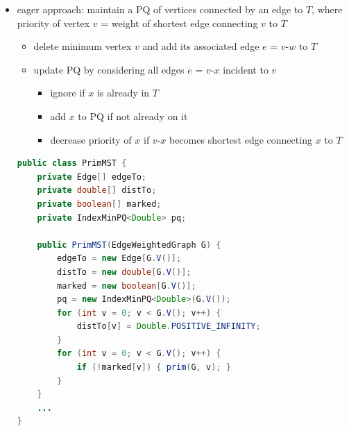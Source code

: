 \documentclass[8pt,a4paper,compress]{beamer}
\begin{document}
\begin{frame}[fragile]
\begin{itemize}
\item eager approach: maintain a PQ of vertices connected by an edge to $T$, where priority of vertex $v$ = weight of shortest edge connecting $v$ to $T$
\begin{itemize}
\item delete minimum vertex $v$ and add its associated edge $e$ = $v$-$w$ to $T$ 

\item update PQ by considering all edges $e$ = $v$-$x$ incident to $v$

\begin{itemize}
\item ignore if $x$ is already in $T$

\item add $x$ to PQ if not already on it

\item decrease priority of $x$ if $v$-$x$ becomes shortest edge connecting $x$ to $T$
\end{itemize}
\end{itemize}

\begin{lstlisting}[language=Java]
public class PrimMST {
    private Edge[] edgeTo; 
    private double[] distTo; 
    private boolean[] marked; 
    private IndexMinPQ<Double> pq;

    public PrimMST(EdgeWeightedGraph G) {
        edgeTo = new Edge[G.V()];
        distTo = new double[G.V()];
        marked = new boolean[G.V()];
        pq = new IndexMinPQ<Double>(G.V());
        for (int v = 0; v < G.V(); v++) { 
            distTo[v] = Double.POSITIVE_INFINITY;
        }
        for (int v = 0; v < G.V(); v++) {
            if (!marked[v]) { prim(G, v); }
        }
    }
    ...
}
\end{lstlisting}
\end{itemize}
\end{frame}
\end{document}
